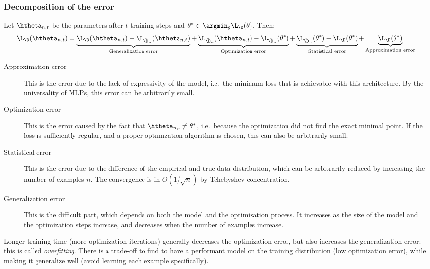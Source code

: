 \subsubsection{Decomposition of the error}
\begin{property}
    Let $\htheta_{n,t}$ be the parameters after $t$ training steps and $\theta^*\in\argmin_\theta\L_\D(\theta)$. Then:
    \begin{equation*}
        \L_\D(\htheta_{n,t})=
        \underbrace{\L_\D(\htheta_{n,t}) - \L_{\hat{\D}_n}(\htheta_{n,t})}_{\textnormal{Generalization error}}
        + \underbrace{\L_{\hat{\D}_n}(\htheta_{n,t}) - \L_{\hat{\D}_n}(\theta^*)}_{\textnormal{Optimization error}}
        + \underbrace{\L_{\hat{\D}_n}(\theta^*) - \L_\D(\theta^*)}_{\textnormal{Statistical error}}
        + \underbrace{\L_\D(\theta^*)}_{\textnormal{Approximation error}}
    \end{equation*}
\end{property}
\begin{description}
    \item[Approximation error] This is the error due to the lack of expressivity of the model, i.e.~the minimum loss that is achievable with this architecture. By the universality of MLPs, this error can be arbitrarily small.
    \item[Optimization error] This is the error caused by the fact that $\htheta_{n,t}\neq\theta^*$, i.e.~because the optimization did not find the exact minimal point. If the loss is sufficiently regular, and a proper optimization algorithm is chosen, this can also be arbitrarily small.
    \item[Statistical error] This is the error due to the difference of the empirical and true data distribution, which can be arbitrarily reduced by increasing the number of examples $n$. The convergence is in $O(1/\sqrt{n})$ by Tchebyshev concentration.
    \item[Generalization error] This is the difficult part, which depends on both the model and the optimization process. It increases as the size of the model and the optimization steps increase, and decreases when the number of examples increase.
\end{description}

Longer training time (more optimization iterations) generally decreases the optimization error, but also increases the generalization error: this is called \emph{overfitting}. There is a trade-off to find to have a performant model on the training distribution (low optimization error), while making it generalize well (avoid learning each example specifically).

